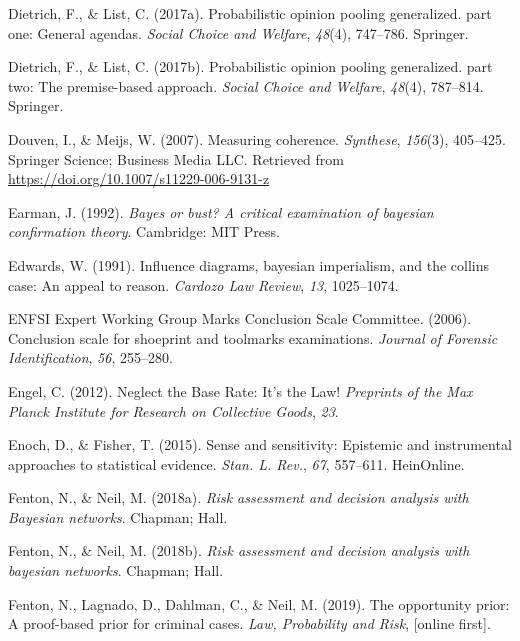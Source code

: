 \documentclass[11pt,dvipsnames,enabledeprecatedfontcommands]{scrartcl}
\begin{document}
\hypertarget{ref-dietrich2017probabilistic1}{}
Dietrich, F., \& List, C. (2017a). Probabilistic opinion pooling
generalized. part one: General agendas. \emph{Social Choice and
Welfare}, \emph{48}(4), 747--786. Springer.

\hypertarget{ref-dietrich2017probabilistic2}{}
Dietrich, F., \& List, C. (2017b). Probabilistic opinion pooling
generalized. part two: The premise-based approach. \emph{Social Choice
and Welfare}, \emph{48}(4), 787--814. Springer.

\hypertarget{ref-Douven2007measuring}{}
Douven, I., \& Meijs, W. (2007). Measuring coherence. \emph{Synthese},
\emph{156}(3), 405--425. Springer Science; Business Media LLC. Retrieved
from \url{https://doi.org/10.1007/s11229-006-9131-z}

\hypertarget{ref-earman1992bayes}{}
Earman, J. (1992). \emph{Bayes or bust? A critical examination of
bayesian confirmation theory}. Cambridge: MIT Press.

\hypertarget{ref-Edwards1991Influence-diagr}{}
Edwards, W. (1991). Influence diagrams, bayesian imperialism, and the
collins case: An appeal to reason. \emph{Cardozo Law Review}, \emph{13},
1025--1074.

\hypertarget{ref-ENFSI2006entropy}{}
ENFSI Expert Working Group Marks Conclusion Scale Committee. (2006).
Conclusion scale for shoeprint and toolmarks examinations. \emph{Journal
of Forensic Identification}, \emph{56}, 255--280.

\hypertarget{ref-engel2012NeglectBaseRate}{}
Engel, C. (2012). Neglect the Base Rate: It's the Law! \emph{Preprints
of the Max Planck Institute for Research on Collective Goods},
\emph{23}.

\hypertarget{ref-enoch2015sense}{}
Enoch, D., \& Fisher, T. (2015). Sense and sensitivity: Epistemic and
instrumental approaches to statistical evidence. \emph{Stan. L. Rev.},
\emph{67}, 557--611. HeinOnline.

\hypertarget{ref-Fenton2018risk}{}
Fenton, N., \& Neil, M. (2018a). \emph{Risk assessment and decision
analysis with Bayesian networks}. Chapman; Hall.

\hypertarget{ref-Fenton2018Risk}{}
Fenton, N., \& Neil, M. (2018b). \emph{Risk assessment and decision
analysis with bayesian networks}. Chapman; Hall.

\hypertarget{ref-fenton2019OpportunityPriorProofbased}{}
Fenton, N., Lagnado, D., Dahlman, C., \& Neil, M. (2019). The
opportunity prior: A proof-based prior for criminal cases. \emph{Law,
Probability and Risk}, {[}online first{]}.
\end{document}
